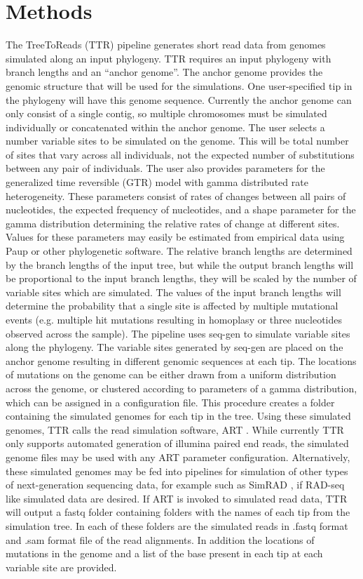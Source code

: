 \documentclass{bioinfo}
\begin{document}
\section{Methods}
The TreeToReads (TTR) pipeline generates short read data from genomes simulated along an input phylogeny.
TTR requires an input phylogeny with branch lengths and an ``anchor genome''. 
The anchor genome provides the genomic structure that will be used for the simulations.
One user-specified tip in the phylogeny will have this genome sequence.
Currently the anchor genome can only consist of a single contig, so multiple chromosomes must be simulated individually or concatenated within the anchor genome.
The user selects a number variable sites to be simulated on the genome.
This will be total number of sites that vary across all individuals, not the expected number of substitutions between any pair of individuals.
The user also provides parameters for the generalized time reversible (GTR) model with gamma distributed rate heterogeneity.
These parameters consist of rates of changes between all pairs of nucleotides, the expected frequency of nucleotides, 
and a shape parameter for the gamma distribution determining the relative rates of change at different sites. 
Values for these parameters may easily be estimated from empirical data using Paup \citep{swofford_paup:_2001} or other phylogenetic software.
The relative branch lengths are determined by the branch lengths of the input tree, but while the output branch lengths will be proportional to the input branch lengths, 
they will be scaled by the number of variable sites which are simulated.
The values of the input branch lengths will determine the probability that a single site is affected by multiple mutational events 
(e.g. multiple hit mutations resulting in homoplasy or three nucleotides observed across the sample).
The pipeline uses seq-gen \citep{rambaut_seq-gen:_1997} to simulate variable sites along the phylogeny.
The variable sites generated by seq-gen are placed on the anchor genome resulting in different genomic sequences at each tip.
The locations of mutations on the genome can be either drawn from a uniform distribution across the genome, 
or clustered according to parameters of a gamma distribution, which can be assigned in a configuration file.
This procedure creates a folder containing the simulated genomes for each tip in the tree.
Using these simulated genomes, TTR calls the read simulation software, ART \citep{huang_art:_2012}.
While currently TTR only supports automated generation of illumina paired end reads, 
the simulated genome files may be used with any ART parameter configuration.
Alternatively, these simulated genomes may be fed into pipelines for simulation of other types of next-generation sequencing data, 
for example such as SimRAD \citep{lepais_simrad:_2014}, if RAD-seq like simulated data are desired.
If ART is invoked to simulated read data, TTR will output a fastq folder containing folders with the names of each tip from the simulation tree. 
In each of these folders are the simulated reads  in .fastq format and .sam format file of the read alignments.
In addition the locations of mutations in the genome and a list of the base present in each tip at each variable site are provided.
\end{document}

